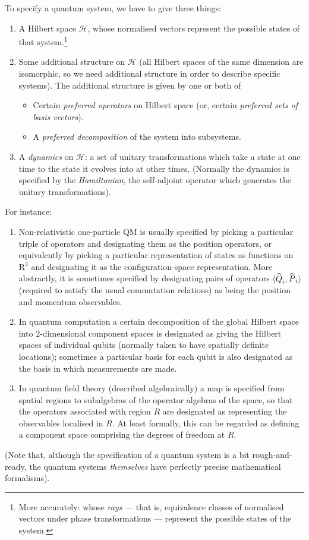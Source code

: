 \documentclass[12pt]{article}
\newcommand{\mc}[1]{\ensuremath{\mathcal{#1}}}
\newcommand{\op}[1]{\ensuremath{\widehat{\textsf{\ensuremath{#1}}}}}
\begin{document}
To specify a quantum system, we have to give three things:
\begin{enumerate}
\item A Hilbert space \mc{H}, whose normalised vectors represent the possible states of that system.\footnote{More accurately: whose \emph{rays} --- that is, equivalence classes of normalised vectors under phase transformations --- represent the possible states of the system. }
\item Some additional structure on \mc{H} (all Hilbert spaces of the same dimension are isomorphic, so we need additional structure in order to describe specific systems). The additional structure is given by one or both of
\begin{itemize}
\item Certain \emph{preferred operators} on Hilbert space (or, certain \emph{preferred sets of basis vectors}).
\item A \emph{preferred decomposition} of the system into subsystems.
\end{itemize}
\item A \emph{dynamics} on \mc{H}: a set of unitary transformations which take a state at one time to the state it evolves into at other times. (Normally the dynamics is specified by the \emph{Hamiltonian}, the self-adjoint operator which generates the unitary transformations).
\end{enumerate}
For instance:
\begin{enumerate}
\item Non-relativistic one-particle QM is usually specified by picking a particular triple of operators and designating them as the position operators, or equivalently by picking a particular representation of states as functions on $\mathbf{\mathrm{R}}^3$ and designating it as the configuration-space representation. More abstractly, it is sometimes specified by designating pairs of operators $\langle \op{Q}_i,\op{P}_i\rangle$ (required to satisfy the usual commutation relations) as being the position and momentum observables.
\item In quantum computation a certain decomposition of the global Hilbert space into 2-dimensional component spaces is designated as giving the Hilbert spaces of individual qubits (normally taken to have spatially definite locations); sometimes a particular basis for each qubit is also designated as the basis in which measurements are made.
\item In quantum field theory (described algebraically) a map is specified from spatial regions to subalgebras of the operator algebras of the space, so that the operators associated with region $R$ are designated as representing the observables localised in $R$. At least formally, this can be regarded as defining a component space comprising the degrees of freedom at $R$.
\end{enumerate}
(Note that, although the specification of a quantum system is a bit rough-and-ready, the quantum systems \emph{themselves} have perfectly precise mathematical formalisms).
\end{document}
